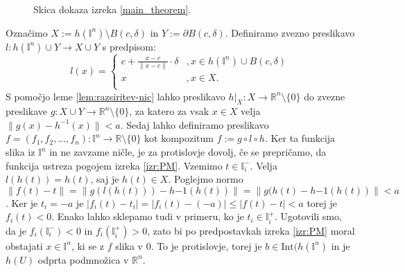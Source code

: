 \documentclass[mat1]{fmfdelo}
\newcommand{\R}{\mathbb R}
\newcommand{\I}{\mathbb I}
\newcommand{\0}{\underline{0}}
\newcommand{\Int}{\text{Int}}
\begin{document}
\begin{dokaz}
\begin{figure}[h!]
	\caption{Skica dokaza izreka \ref{main_theorem}.}
\end{figure}

Označimo $X := h(\I^n) \setminus B(c, \delta)$ in $Y := \partial B(c, \delta)$. Definiramo zvezno preslikavo $l : h(\I^n) \cup Y \to X \cup Y$ s predpisom:
\[  l(x) = \left\{
\begin{array}{ll}
	c + \frac{x - c}{\| x - c \|} \cdot \delta &, x \in h(\I^n) \cup B(c, \delta) \\
	x &, x \in X. \\
\end{array} 
\right. \]
S pomočjo leme \ref{lem:razsiritev-nic} lahko preslikavo $h|_X : X \to \R^n \setminus \{ 0 \}$ do zvezne preslikave $g : X \cup Y \to \R^n \setminus \{ 0 \}$, za katero za vsak $x \in X$ velja $\| g(x) - h^{-1}(x) \| < a$.
Sedaj lahko definiramo preslikavo $f = (f_1, f_2, \dots, f_n) : \I^n \to \R \setminus \{ 0 \}$ kot kompozitum $f := g \circ l \circ h$. Ker ta funkcija slika iz $\I^n$ in ne zavzame ničle, je za protislovje dovolj, če se prepričamo, da funkcija ustreza pogojem izreka \ref{izr:PM}. Vzemimo $t \in \I_i^-$. Velja $l(h(t)) = h(t)$, saj je $h(t) \in X$. Poglejmo normo $\| f(t) - t \| = \| g(l(h(t))) - h{-1}(h(t)) \| = \| g(h(t) - h{-1}(h(t)) \| < a$. Ker je $t_i = - a$ je $| f_i (t) - t_i | = | f_i (t) - ( - a) | \leq | f (t) - t | < a$ torej je $f_i(t) < 0$. Enako lahko sklepamo tudi v primeru, ko je $t_i \in \I_i^+$. Ugotovili smo, da je  $f_i(\I_i^-) < 0$ in $f_i(\I_i^+) > 0$, zato bi po predpostavkah izreka \ref{izr:PM} moral obstajati $x \in \I^n$, ki se z $f$ slika v $0$. To je protislovje, torej je $b \in \Int (h(\I^n)$ in je $h(U)$ odprta podmnožica v $\R^n$.
\end{dokaz}
\end{document}
